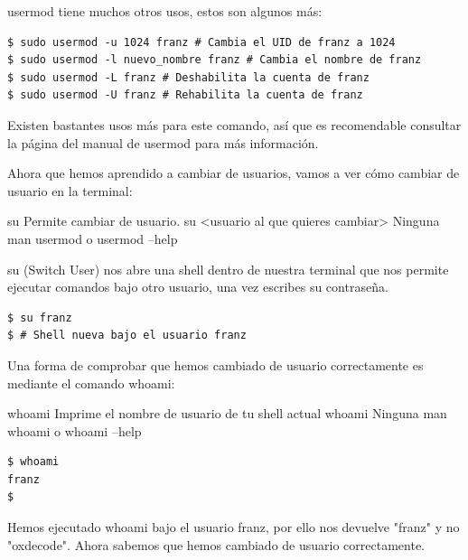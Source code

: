 usermod tiene muchos otros usos, estos son algunos más:

\begin{tcolorbox-code}
\begin{lstlisting}
$ sudo usermod -u 1024 franz # Cambia el UID de franz a 1024
$ sudo usermod -l nuevo_nombre franz # Cambia el nombre de franz
$ sudo usermod -L franz # Deshabilita la cuenta de franz
$ sudo usermod -U franz # Rehabilita la cuenta de franz
\end{lstlisting}
\end{tcolorbox-code}

Existen bastantes usos más para este comando, así que es recomendable consultar la página del manual de usermod para más información.

Ahora que hemos aprendido a cambiar de usuarios, vamos a ver cómo cambiar de usuario en la terminal:

\begin{command-info}
{su}
{Permite cambiar de usuario.}
{su <usuario al que quieres cambiar>}
{Ninguna}
{man usermod o usermod --help}
\end{command-info}

su (Switch User) nos abre una shell dentro de nuestra terminal que nos permite ejecutar comandos bajo otro usuario, una vez escribes su contraseña.

\begin{tcolorbox-code}
\begin{lstlisting}
$ su franz
$ # Shell nueva bajo el usuario franz
\end{lstlisting}
\end{tcolorbox-code}

Una forma de comprobar que hemos cambiado de usuario correctamente es mediante el comando whoami:

\begin{command-info}
{whoami}
{Imprime el nombre de usuario de tu shell actual}
{whoami}
{Ninguna}
{man whoami o whoami --help}
\end{command-info}

\begin{tcolorbox-code}
\begin{lstlisting}
$ whoami
franz
$
\end{lstlisting}
\end{tcolorbox-code}

Hemos ejecutado whoami bajo el usuario franz, por ello nos devuelve "franz" y no "oxdecode". Ahora sabemos que hemos cambiado de usuario correctamente.

